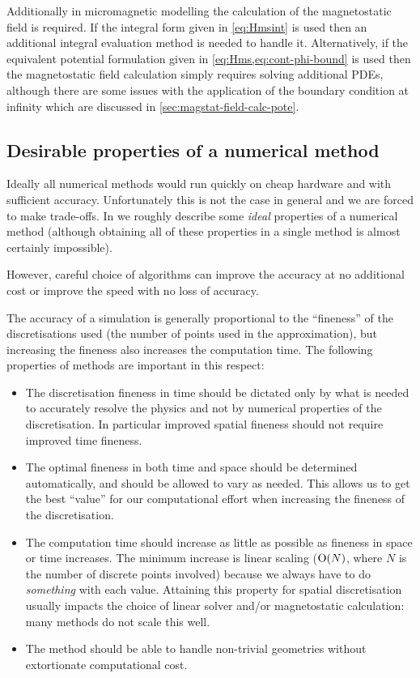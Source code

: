 Additionally in micromagnetic modelling the calculation of the magnetostatic field is required.
If the integral form given in \cref{eq:Hmsint} is used then an additional integral evaluation method is needed to handle it.
Alternatively, if the equivalent potential formulation given in \cref{eq:Hms,eq:cont-phi-bound} is used then the magnetostatic field calculation simply requires solving additional PDEs, although there are some issues with the application of the boundary condition at infinity which are discussed in \cref{sec:magstat-field-calc-pote}.


\subsection{Desirable properties of a numerical method}
\label{sec:desir-prop-numer}

Ideally all numerical methods would run quickly on cheap hardware and with sufficient accuracy.
Unfortunately this is not the case in general and we are forced to make trade-offs.
In  we roughly describe some \emph{ideal} properties of a numerical method (although obtaining all of these properties in a single method is almost certainly impossible).

However, careful choice of algorithms can improve the accuracy at no additional cost or improve the speed with no loss of accuracy.


The accuracy of a simulation is generally proportional to the ``fineness''  of the discretisations used (\ie the number of points used in the approximation), but increasing the fineness also increases the computation time.
The following properties of methods are important in this respect:
\begin{itemize}
\item The discretisation fineness in time should be dictated only by what is needed to accurately resolve the physics and not by numerical properties of the discretisation.
  In particular improved spatial fineness should not require improved time fineness.

\item The optimal fineness in both time and space should be determined automatically, and should be allowed to vary as needed.
  This allows us to get the best ``value'' for our computational effort when increasing the fineness of the discretisation.

\item The computation time should increase as little as possible as fineness in space or time increases.
  The minimum increase is linear scaling ($\mathrm{O}{\left( N \right)}$, where $N$ is the number of discrete points involved) because we always have to do \emph{something} with each value.
  Attaining this property for spatial discretisation usually impacts the choice of linear solver and/or magnetostatic calculation: many methods do not scale this well.

\item The method should be able to handle non-trivial geometries without extortionate computational cost.
\end{itemize}

